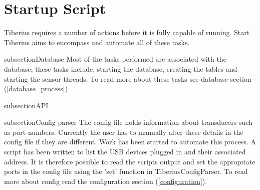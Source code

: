 \section{Startup Script}
\pagestyle{aidan}
\label{sec:misc_startup_script} %

Tiberius requires a number of actions before it is fully capable of running. Start Tiberius aims to encompass and automate all of these tasks. 

subsection{Database}
Most of the tasks performed are associated with the database; these tasks include, starting the database, creating the tables and starting the sensor threads. To read more about these tasks see database section (\ref{database_process})

subsection{API}

subsection{Config parser}
The config file holds information about transducers such as port numbers. Currently the user has to manually alter these details in the config file if they are different. Work has been started to automate this process. A script has been written to list the USB devices plugged in and their associated address. It is therefore possible to read the scripts output and set the appropriate ports in the config file using the 'set' function in TiberiusConfigParser. To read more about config read the configuration section (\ref{configuration}).

